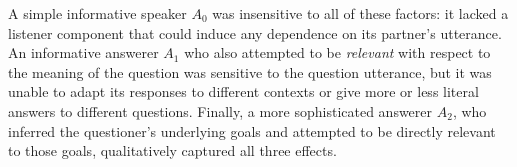 \documentclass[12pt, floatsintext, jou]{apa6}
\begin{document}
A simple informative speaker $A_0$ was insensitive to all of these factors: it lacked a listener component that could induce any dependence on its partner's utterance. 
An informative answerer $A_1$ who also attempted to be \emph{relevant} with respect to the meaning of the question was sensitive to the question utterance, but it was unable to adapt its responses to different contexts or give more or less literal answers to different questions. 
Finally, a more sophisticated answerer $A_2$, who inferred the questioner's underlying goals and attempted to be directly relevant to those goals, qualitatively captured all three effects.



\end{document}
